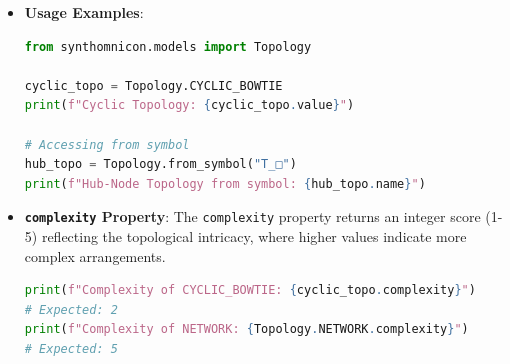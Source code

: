 \documentclass[12pt,a4paper]{article}
\begin{document}
\begin{itemize}
\begin{itemize}
    \item \texttt{CAGE} (\texttt{''T\_cage''} / \texttt{''T\_□□''}): Fully enclosed, hollow structures --- 3D closure required (e.g., cucurbiturils, Fujita spheres, COCs).
    \item \texttt{BOWL} (\texttt{''T\_bowl''} / \texttt{''$T_{\cup}$''}): Open concave cavity with a single portal --- guest enters and exits freely; K\_fast is the default (e.g., calixarenes, resorcinarenes, pillar{[}n{]}arenes, cyclotriveratrylenes). Distinguished from T\_□□ by the absence of full 3D closure: $T_{\cup}$ $\rightarrow$ T\_□□ is non-conservative (changes kinetic regime). \emph{Identified through catalog self-audit in v0.3.6.}
    \item \texttt{BRAID} (\texttt{''T\_braid''} / \texttt{''T\_↗↙''}): \textbf{NEW in v0.4.0.} Anyonic/braided exchange statistics --- the topology of braid groups, not spatial connectivity. Encodes systems where particle exchange is described by non-abelian braid operations rather than simple permutations (Z₂ for bosons/fermions). \texttt{tensor(T\_braid, T\_braid) -\textgreater{} T\_braid} (anyonic statistics preserved). \texttt{T\_braid ⊓ T\_linear = \perp} (no classical topology sits below both). Complexity 4. Physical systems: fractional quantum Hall states ($\nu$=1/3, $\nu$=5/2), Kitaev honeycomb B-phase, non-abelian Majorana platforms. \emph{Identified as missing from the T lattice via quantum particle encoding (v0.4.0).}
\end{itemize}

    \item 
    \textbf{Usage Examples}:

    \begin{lstlisting}[language=Python]
from synthomnicon.models import Topology

cyclic_topo = Topology.CYCLIC_BOWTIE
print(f"Cyclic Topology: {cyclic_topo.value}")

# Accessing from symbol
hub_topo = Topology.from_symbol("T_□")
print(f"Hub-Node Topology from symbol: {hub_topo.name}")
\end{lstlisting}

    \item 
    \textbf{\texttt{complexity} Property}:
The \texttt{complexity} property returns an integer score (1-5) reflecting the topological intricacy, where higher values indicate more complex arrangements.

    \begin{lstlisting}[language=Python]
print(f"Complexity of CYCLIC_BOWTIE: {cyclic_topo.complexity}")
# Expected: 2
print(f"Complexity of NETWORK: {Topology.NETWORK.complexity}")
# Expected: 5
\end{lstlisting}

\end{itemize}
\end{document}
